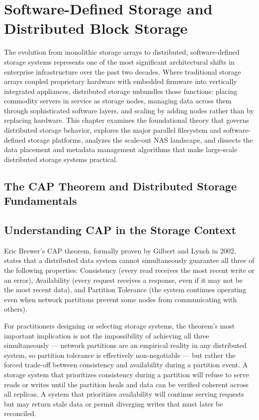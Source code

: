 \chapter{Software-Defined Storage and Distributed Block Storage}
\label{ch:7}

The evolution from monolithic storage arrays to distributed, software-defined storage systems represents one of the most significant architectural shifts in enterprise infrastructure over the past two decades. Where traditional storage arrays coupled proprietary hardware with embedded firmware into vertically integrated appliances, distributed storage unbundles those functions: placing commodity servers in service as storage nodes, managing data across them through sophisticated software layers, and scaling by adding nodes rather than by replacing hardware. This chapter examines the foundational theory that governs distributed storage behavior, explores the major parallel filesystem and software-defined storage platforms, analyzes the scale-out NAS landscape, and dissects the data placement and metadata management algorithms that make large-scale distributed storage systems practical.

\section{The CAP Theorem and Distributed Storage Fundamentals}
\section{Understanding CAP in the Storage Context}
Eric Brewer's CAP theorem, formally proven by Gilbert and Lynch in 2002, states that a distributed data system cannot simultaneously guarantee all three of the following properties: Consistency (every read receives the most recent write or an error), Availability (every request receives a response, even if it may not be the most recent data), and Partition Tolerance (the system continues operating even when network partitions prevent some nodes from communicating with others).

For practitioners designing or selecting storage systems, the theorem's most important implication is not the impossibility of achieving all three simultaneously --- network partitions are an empirical reality in any distributed system, so partition tolerance is effectively non-negotiable --- but rather the forced trade-off between consistency and availability during a partition event. A storage system that prioritizes consistency during a partition will refuse to serve reads or writes until the partition heals and data can be verified coherent across all replicas. A system that prioritizes availability will continue serving requests but may return stale data or permit diverging writes that must later be reconciled.

